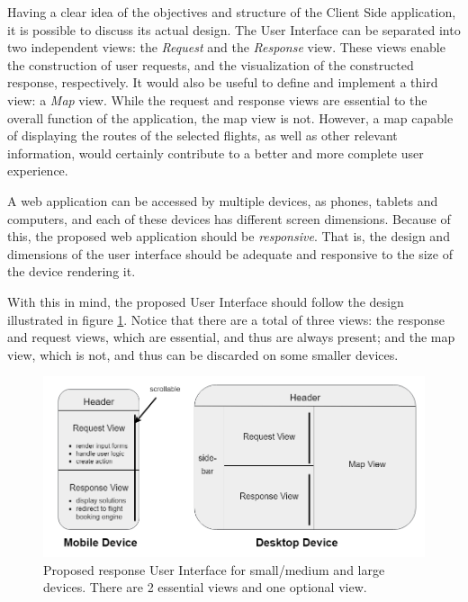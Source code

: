Having a clear idea of the objectives and structure of the Client Side application, it is possible to discuss its actual design. The User Interface can be separated into two independent views: the \textit{Request} and the \textit{Response} view. These views enable the construction of user requests, and the visualization of the constructed response,  respectively. It would also be useful to define and implement a third view: a \textit{Map} view. While the request and response views are essential to the overall function of the application, the map view is not. However, a map capable of displaying the routes of the selected flights, as well as other relevant information, would certainly contribute to a better and more complete user experience.

A web application can be accessed by multiple devices, as phones, tablets and computers, and each of these devices has different screen dimensions. Because of this, the proposed web application should be \textit{responsive}. That is, the design and dimensions of the user interface should be adequate and responsive to the size of the device rendering it.

With this in mind, the proposed User Interface should follow the design illustrated in figure \ref{fig:UI_design}. Notice that there are a total of three views: the response and request views, which are essential, and thus are always present; and the map view, which is not, and thus can be discarded on some smaller devices.

\begin{figure}[htpb]
  \centering
  \includegraphics[width=\textwidth]{./Figures/system_design/UI_design.png}
  \caption{Proposed response User Interface for small/medium and large devices. 
  There are 2 essential views and one optional view.}
  \label{fig:UI_design}
\end{figure}
